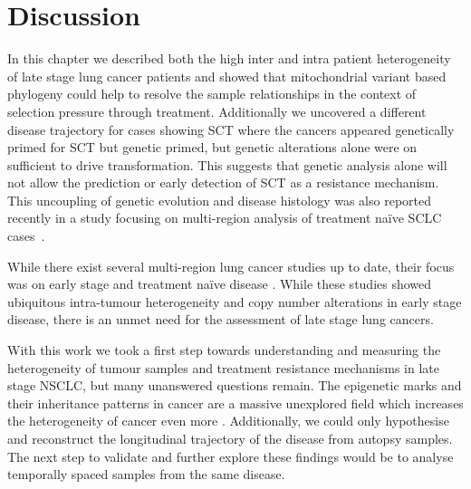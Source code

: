 \section{Discussion}
\label{cascade-sec:outlook}

In this chapter we described both the high inter and intra patient heterogeneity of late stage lung cancer patients and showed that mitochondrial variant based phylogeny could help to resolve the sample relationships in the context of selection pressure through treatment. Additionally we uncovered a different disease trajectory for cases showing SCT where the cancers appeared genetically primed for SCT but genetic primed, but genetic alterations alone were on sufficient to drive transformation. This suggests that genetic analysis alone will not allow the prediction or early detection of SCT as a resistance mechanism. This uncoupling of genetic evolution and disease histology was also reported recently in a study focusing on multi-region analysis of treatment na\"ive SCLC cases~\cite{Zhou2021}.

While there exist several multi-region lung cancer studies up to date, their focus was on early stage and treatment na\"ive disease \cite{JamalHanjani2017,Leong2018}. While these studies showed ubiquitous intra-tumour heterogeneity and copy number alterations in early stage disease, there is an unmet need for the assessment of late stage lung cancers\cite{Zhang2014}. \cite{Network2012,CGARN2014,George2015}

With this work we took a first step towards understanding and measuring the heterogeneity of tumour samples and treatment resistance mechanisms in late stage NSCLC, but many unanswered questions remain. The epigenetic marks and their inheritance patterns in cancer are a massive unexplored field which increases the heterogeneity of cancer even more \cite{Easwaran2014}. Additionally, we could only hypothesise and reconstruct the longitudinal trajectory of the disease from autopsy samples. The next step to validate and further explore these findings would be to analyse temporally spaced samples from the same disease.